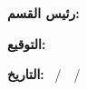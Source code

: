 \vspace{36pt}

\noindent\textbf{رئيس القسم:} \thesisDeptHeadAR

\vspace{36pt}
\noindent\textbf{التوقيع:} \makebox[8cm]{\dotfill}

\vspace{30pt}
\noindent\textbf{التاريخ:} \makebox[2.2cm]{\dotfill}\ /\ \makebox[2.2cm]{\dotfill}\ /\ \makebox[2.2cm]{\dotfill}

\clearpage
